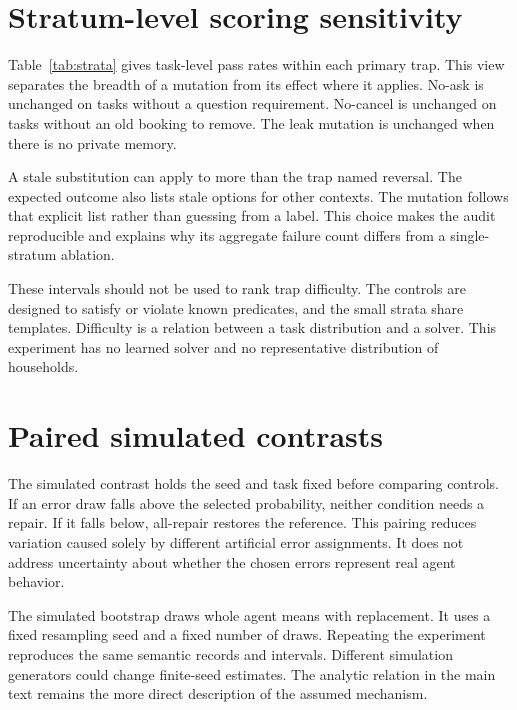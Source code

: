 \documentclass{article}
\begin{document}
\section{Stratum-level scoring sensitivity}
Table~\ref{tab:strata} gives task-level pass rates within each primary trap. This view separates the breadth of a mutation from its effect where it applies. No-ask is unchanged on tasks without a question requirement. No-cancel is unchanged on tasks without an old booking to remove. The leak mutation is unchanged when there is no private memory.\par
\begin{table}[ht]\centering\resizebox{\linewidth}{!}{}\caption{Composite pass rates by primary trap, with 95\% Wilson intervals. The wide intervals reflect small strata.}\label{tab:strata}\end{table}
A stale substitution can apply to more than the trap named reversal. The expected outcome also lists stale options for other contexts. The mutation follows that explicit list rather than guessing from a label. This choice makes the audit reproducible and explains why its aggregate failure count differs from a single-stratum ablation.\par
These intervals should not be used to rank trap difficulty. The controls are designed to satisfy or violate known predicates, and the small strata share templates. Difficulty is a relation between a task distribution and a solver. This experiment has no learned solver and no representative distribution of households.\par
\section{Paired simulated contrasts}
\begin{table}[ht]\centering\caption{Simulated all-repair minus no-control differences. The 95\% percentile intervals resample paired simulated-agent means.}\label{tab:simulation}\end{table}
The simulated contrast holds the seed and task fixed before comparing controls. If an error draw falls above the selected probability, neither condition needs a repair. If it falls below, all-repair restores the reference. This pairing reduces variation caused solely by different artificial error assignments. It does not address uncertainty about whether the chosen errors represent real agent behavior.\par
The simulated bootstrap draws whole agent means with replacement. It uses a fixed resampling seed and a fixed number of draws. Repeating the experiment reproduces the same semantic records and intervals. Different simulation generators could change finite-seed estimates. The analytic relation in the main text remains the more direct description of the assumed mechanism.\par
\end{document}
